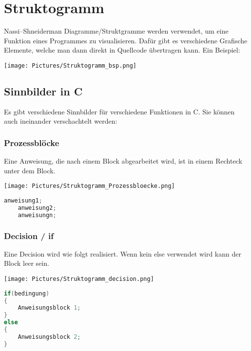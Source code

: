 \section{Struktogramm}

Nassi–Shneiderman Diagramme/Struktgramme werden verwendet, um eine Funktion eines Programmes zu visualisieren. Dafür gibt es verschiedene Grafische Elemente, welche man dann direkt in Quellcode übertragen kann.\newline
Ein Beispiel:\newline

\texttt{[image: Pictures/Struktogramm\_bsp.png]}

\subsection{Sinnbilder in C}

Es gibt verschiedene Sinnbilder für verschiedene Funktionen in C. Sie können auch ineinander verschachtelt werden:

\subsubsection{Prozessblöcke}

Eine Anweisung, die nach einem Block abgearbeitet wird, ist in einem Rechteck unter dem Block. \newline

\noindent
\begin{minipage}{0.2\columnwidth} 
    \texttt{[image: Pictures/Struktogramm\_Prozessbloecke.png]}
\end{minipage}
\begin{minipage}{0.75\columnwidth} 
\begin{lstlisting}[language = c]
    anweisung1;
    anweisung2;
    anweisungn;
\end{lstlisting}
\end{minipage}

\subsubsection{Decision / if}

Eine Decision wird wie folgt realisiert. Wenn kein else verwendet wird kann der Block leer sein.\newline

\noindent
\begin{minipage}{0.4\columnwidth} 
\texttt{[image: Pictures/Struktogramm\_decision.png]}
\end{minipage}
\begin{minipage}{0.6\columnwidth} 
\begin{lstlisting}[language = c]
if(bedingung)
{
    Anweisungsblock 1;
}
else
{
    Anweisungsblock 2;
}
\end{lstlisting}
\end{minipage}


